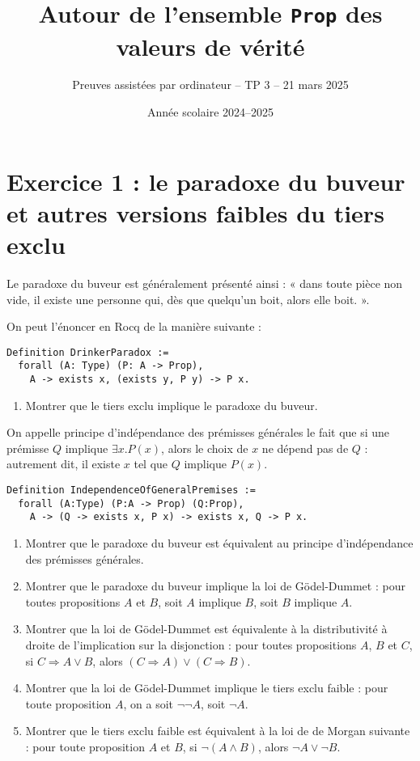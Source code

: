 \documentclass{article}
\begin{document}
\title{Autour de l'ensemble \texttt{Prop} des valeurs de vérité}
\author{Preuves assistées par ordinateur -- TP 3 -- 21 mars 2025}
\date{Année scolaire 2024--2025}
\maketitle

\section*{Exercice 1 : le paradoxe du buveur et autres versions faibles du tiers exclu}

Le paradoxe du buveur est généralement présenté ainsi : « dans toute pièce non vide, il existe une personne qui, dès que quelqu'un boit, alors elle boit. ».

On peut l'énoncer en Rocq de la manière suivante :

\begin{verbatim}
Definition DrinkerParadox :=
  forall (A: Type) (P: A -> Prop),
    A -> exists x, (exists y, P y) -> P x.
\end{verbatim}

\begin{enumerate}
\item Montrer que le tiers exclu implique le paradoxe du buveur.
\end{enumerate}

On appelle principe d'indépendance des prémisses générales le fait que si une prémisse \(Q\) implique \(\exists x.P(x)\), alors le choix de \(x\) ne dépend pas de \(Q\) : autrement dit, il existe \(x\) tel que \(Q\) implique \(P(x)\).

\begin{verbatim}
Definition IndependenceOfGeneralPremises :=
  forall (A:Type) (P:A -> Prop) (Q:Prop),
    A -> (Q -> exists x, P x) -> exists x, Q -> P x.
\end{verbatim}

\begin{enumerate}[resume]
\item Montrer que le paradoxe du buveur est équivalent au principe d'indépendance des prémisses générales.
\item Montrer que le paradoxe du buveur implique la loi de Gödel-Dummet : pour toutes propositions \(A\) et \(B\), soit \(A\) implique \(B\), soit \(B\) implique \(A\).
\item Montrer que la loi de Gödel-Dummet est équivalente à la distributivité à droite de l'implication sur la disjonction : pour toutes propositions \(A\), \(B\) et \(C\), si \(C \Rightarrow A \vee B\), alors \((C \Rightarrow A) \vee (C \Rightarrow B)\).
\item Montrer que la loi de Gödel-Dummet implique le tiers exclu faible : pour toute proposition \(A\), on a soit \(\neg \neg A\), soit \(\neg A\).
\item Montrer que le tiers exclu faible est équivalent à la loi de de Morgan suivante : pour toute proposition \(A\) et \(B\), si \(\neg (A \wedge B)\), alors \(\neg A \vee \neg B\).
\end{enumerate}
\end{document}
